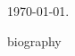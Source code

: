 \documentclass{minimal}
\begin{document}
\today.

\begin{minipage}{1sp}
biography
\end{minipage}
\end{document}
